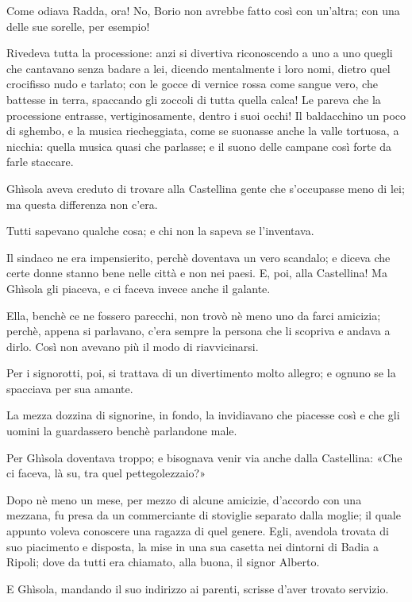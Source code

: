 Come odiava Radda, ora! No, Borio non avrebbe fatto così con un’altra; con una delle sue sorelle, per esempio!

Rivedeva tutta la processione: anzi si divertiva riconoscendo a uno a uno quegli che cantavano senza badare a lei, dicendo mentalmente i loro nomi, dietro quel crocifisso nudo e tarlato; con le gocce di vernice rossa come sangue vero, che battesse in terra, spaccando gli zoccoli di tutta quella calca! Le pareva che la processione entrasse, vertiginosamente, dentro i suoi occhi! Il baldacchino un poco di sghembo, e la musica riecheggiata, come se suonasse anche la valle tortuosa, a nicchia: quella musica quasi che parlasse; e il suono delle campane così forte da farle staccare.

Ghìsola aveva creduto di trovare alla Castellina gente che s’occupasse meno di lei; ma questa differenza non c’era.

Tutti sapevano qualche cosa; e chi non la sapeva se l’inventava.

Il sindaco ne era impensierito, perchè doventava un vero scandalo; e diceva che certe donne stanno bene nelle città e non nei paesi. E, poi, alla Castellina! Ma Ghìsola gli piaceva, e ci faceva invece anche il galante.

Ella, benchè ce ne fossero parecchi, non trovò nè meno uno da farci amicizia; perchè, appena si parlavano, c’era sempre la persona che li scopriva e andava a dirlo. Così non avevano più il modo di riavvicinarsi.

Per i signorotti, poi, si trattava di un divertimento molto allegro; e ognuno se la spacciava per sua amante.

La mezza dozzina di signorine, in fondo, la invidiavano che piacesse così e che gli uomini la guardassero benchè parlandone male.

Per Ghìsola doventava troppo; e bisognava venir via anche dalla Castellina: «Che ci faceva, là su, tra quel pettegolezzaio?»

Dopo nè meno un mese, per mezzo di alcune amicizie, d’accordo con una mezzana, fu presa da un commerciante di stoviglie separato dalla moglie; il quale appunto voleva conoscere una ragazza di quel genere. Egli, avendola trovata di suo piacimento e disposta, la mise in una sua casetta nei dintorni di Badia a Ripoli; dove da tutti era chiamato, alla buona, il signor Alberto.

E Ghìsola, mandando il suo indirizzo ai parenti, scrisse d’aver trovato servizio.
